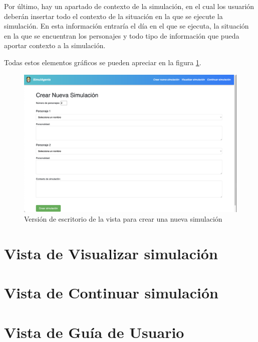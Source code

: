 Por último, hay un apartado de contexto de la simulación, en el cual los usuarión deberán insertar todo el contexto de la situación en la que se ejecute la simulación. En esta información entraría el día en el que se ejecuta, la situación en la que se encuentran los personajes y todo tipo de información que pueda aportar contexto a la simulación.

Todas estos elementos gráficos se pueden apreciar en la figura \ref{fig:vistaCrearSimulacion}.

\begin{figure}[h]
	\centering
	\includegraphics[width = 1\textwidth]{Imagenes/Vectorial/vistaCrearSimulacion.png}
	\caption{Versión de escritorio de la vista para crear una nueva simulación}
	\label{fig:vistaCrearSimulacion}
\end{figure}

\section{Vista de Visualizar simulación}

\section{Vista de Continuar simulación}

\section{Vista de Guía de Usuario}
